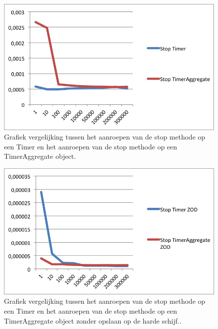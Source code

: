 \begin{figure}[!h]
  \centering
  \includegraphics[scale=1.0]{Afbeeldingen/Evaluatie/StopVSTimerAggregate}
  \caption{Grafiek vergelijking tussen het aanroepen van de stop methode op een Timer en het aanroepen van de stop methode op een TimerAggregate object.}
  \label{fig:StopVSTimerAggregate}
\end{figure}

\begin{figure}[!h]
  \centering
  \includegraphics[scale=1.0]{Afbeeldingen/Evaluatie/StopVSTimerAggregateZOD}
  \caption{Grafiek vergelijking tussen het aanroepen van de stop methode op een Timer en het aanroepen van de stop methode op een TimerAggregate object zonder opslaan op de harde schijf..}
  \label{fig:StopVSTimerAggregateZOD}
\end{figure}



